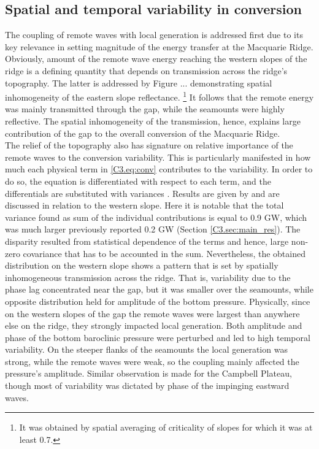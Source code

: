 \documentclass[12pt]{article}
\begin{document}
\subsection{Spatial and temporal variability in conversion}
\label{C3.sec:spat_conv}
The coupling of remote waves with local generation is addressed first due to its key relevance in 
setting magnitude of the energy transfer at the Macquarie Ridge. Obviously, amount of the remote 
wave energy reaching the western slopes of the ridge is a defining quantity that depends on 
transmission 
across the ridge's topography. The latter is addressed by Figure ... demonstrating spatial 
inhomogeneity of 
the eastern slope reflectance. \footnote{It was obtained by spatial averaging of criticality of 
	slopes 
	for which it was at least 0.7.} It follows that the remote energy was mainly transmitted 
	through 
the 
gap, while the seamounts were highly reflective. The spatial inhomogeneity of the transmission, 
hence, explains large contribution of the gap to the overall conversion of the Macquarie Ridge.\\

The relief of the topography also has signature on relative importance of the remote waves to the 
conversion variability. This is particularly manifested in how much each physical term in 
\eqref{C3.eq:conv} contributes to the variability. In order to do so, the equation is 
differentiated with respect to each term, and the differentials are substituted with variances 
\citep{kerry2014impact}. Results are given by  and are discussed in relation 
to the western slope. Here it is notable that the total 
variance found as sum of the individual contributions is equal to 0.9 GW, which was  
much larger previously reported 0.2 GW (Section \ref{C3.sec:main_res}). The disparity resulted 
from statistical dependence of the terms and hence, large non-zero covariance that has to be 
accounted in the sum. Nevertheless, the obtained distribution on the western slope 
shows a pattern that is set by spatially inhomogeneous transmission across the ridge. 
That is, variability due to the phase lag concentrated near the gap, but it was smaller over the 
seamounts, while opposite distribution held for amplitude of the bottom pressure. 
Physically, since on the western slopes of the gap the remote waves were largest than anywhere else 
on the ridge, they strongly impacted local generation. Both amplitude and phase of the bottom 
baroclinic pressure were perturbed and led to high 
temporal variability. On the 
steeper flanks of the seamounts the local generation was strong, while the remote waves were 
weak, so the coupling mainly affected the pressure's amplitude. Similar observation is made for the 
Campbell Plateau, though most of variability was dictated by phase of the impinging eastward 
waves.\\
\end{document}
